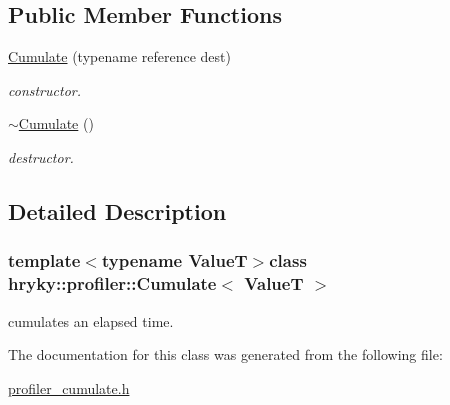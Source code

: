 \subsection*{Public Member Functions}
\begin{DoxyCompactItemize}
\item 
\hypertarget{classhryky_1_1profiler_1_1_cumulate_a7dc86263b187cbd5fd60da1e4c3a442b}{\hyperlink{classhryky_1_1profiler_1_1_cumulate_a7dc86263b187cbd5fd60da1e4c3a442b}{Cumulate} (typename reference dest)}\label{classhryky_1_1profiler_1_1_cumulate_a7dc86263b187cbd5fd60da1e4c3a442b}

\begin{DoxyCompactList}\small\item\em constructor. \end{DoxyCompactList}\item 
\hypertarget{classhryky_1_1profiler_1_1_cumulate_aa0f40543187530e3cc2f3deb50a85726}{\hyperlink{classhryky_1_1profiler_1_1_cumulate_aa0f40543187530e3cc2f3deb50a85726}{$\sim$\-Cumulate} ()}\label{classhryky_1_1profiler_1_1_cumulate_aa0f40543187530e3cc2f3deb50a85726}

\begin{DoxyCompactList}\small\item\em destructor. \end{DoxyCompactList}\end{DoxyCompactItemize}


\subsection{Detailed Description}
\subsubsection*{template$<$typename Value\-T$>$class hryky\-::profiler\-::\-Cumulate$<$ Value\-T $>$}

cumulates an elapsed time. 

The documentation for this class was generated from the following file\-:\begin{DoxyCompactItemize}
\item 
\hyperlink{profiler__cumulate_8h}{profiler\-\_\-cumulate.\-h}\end{DoxyCompactItemize}
